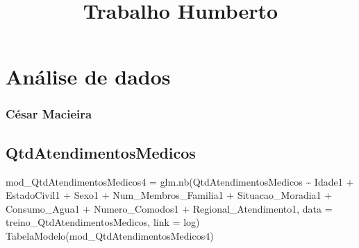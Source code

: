 \documentclass[
]{article}
\title{Trabalho Humberto}
\author{}
\date{\vspace{-2.5em}}
\newenvironment{Shaded}{\begin{snugshade}}{\end{snugshade}}
\newcommand{\AttributeTok}[1]{\textcolor[rgb]{0.77,0.63,0.00}{#1}}
\newcommand{\FunctionTok}[1]{\textcolor[rgb]{0.00,0.00,0.00}{#1}}
\newcommand{\NormalTok}[1]{#1}
\newcommand{\OtherTok}[1]{\textcolor[rgb]{0.56,0.35,0.01}{#1}}
\newcommand{\SpecialCharTok}[1]{\textcolor[rgb]{0.00,0.00,0.00}{#1}}
\newcommand{\StringTok}[1]{\textcolor[rgb]{0.31,0.60,0.02}{#1}}
\begin{document}
\maketitle

\hypertarget{anuxe1lise-de-dados}{%
\section{Análise de dados}\label{anuxe1lise-de-dados}}

\hypertarget{cuxe9sar-macieira}{%
\subsubsection{César Macieira}\label{cuxe9sar-macieira}}

\hypertarget{qtdatendimentosmedicos}{%
\subsection{QtdAtendimentosMedicos}\label{qtdatendimentosmedicos}}

\begin{Shaded}
\begin{Highlighting}[]
\NormalTok{mod\_QtdAtendimentosMedicos4 }\OtherTok{=} 
  \FunctionTok{glm.nb}\NormalTok{(QtdAtendimentosMedicos }\SpecialCharTok{\textasciitilde{}}\NormalTok{ Idade1 }\SpecialCharTok{+}\NormalTok{ EstadoCivil1 }\SpecialCharTok{+}\NormalTok{ Sexo1 }\SpecialCharTok{+}\NormalTok{ Num\_Membros\_Familia1 }\SpecialCharTok{+} 
\NormalTok{           Situacao\_Moradia1 }\SpecialCharTok{+}\NormalTok{ Consumo\_Agua1 }\SpecialCharTok{+}\NormalTok{ Numero\_Comodos1 }\SpecialCharTok{+} 
\NormalTok{           Regional\_Atendimento1, }\AttributeTok{data =}\NormalTok{ treino\_QtdAtendimentosMedicos, }\AttributeTok{link =} \StringTok{\textquotesingle{}log\textquotesingle{}}\NormalTok{)}
\FunctionTok{TabelaModelo}\NormalTok{(mod\_QtdAtendimentosMedicos4)}
\end{Highlighting}
\end{Shaded}
\end{document}
